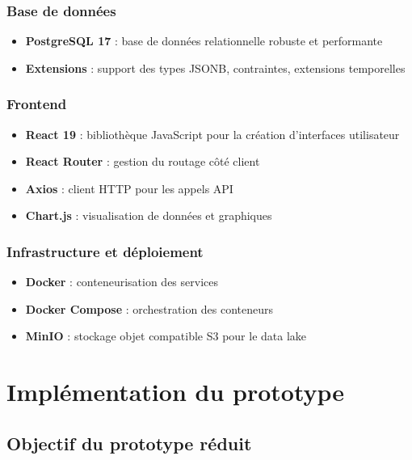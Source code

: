 \documentclass[a4paper, 12pt]{book}
\begin{document}
\subsection{Base de données}
\begin{itemize}
    \item \textbf{PostgreSQL 17} : base de données relationnelle robuste et performante
    \item \textbf{Extensions} : support des types JSONB, contraintes, extensions temporelles
\end{itemize}

\subsection{Frontend}
\begin{itemize}
    \item \textbf{React 19} : bibliothèque JavaScript pour la création d'interfaces utilisateur
    \item \textbf{React Router} : gestion du routage côté client
    \item \textbf{Axios} : client HTTP pour les appels API
    \item \textbf{Chart.js} : visualisation de données et graphiques
\end{itemize}

\subsection{Infrastructure et déploiement}
\begin{itemize}
    \item \textbf{Docker} : conteneurisation des services
    \item \textbf{Docker Compose} : orchestration des conteneurs
    \item \textbf{MinIO} : stockage objet compatible S3 pour le data lake
\end{itemize}

\chapter{Implémentation du prototype}

\section{Objectif du prototype réduit}
\end{document}
